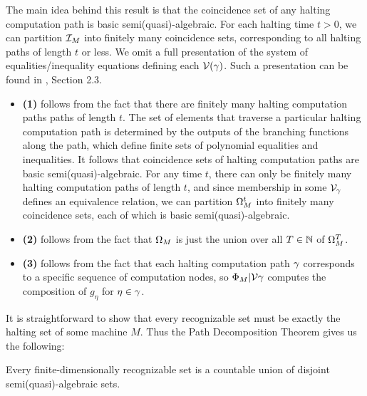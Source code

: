   \begin{proofsketch}
    
    The main idea behind this result is that the coincidence set of
    any halting computation path is basic semi(quasi)-algebraic.  For
    each halting time $t > 0$, we can partition $\mathcal{I}_M$ into
    finitely many coincidence sets, corresponding to all halting paths
    of length $t$ or less.  We omit a full presentation of the system
    of equalities/inequality equations defining each
    $\mathcal{V}(\gamma)$.  Such a presentation can be found in
    \cite{B98}, Section 2.3.

    \begin{itemize}
    \item \textbf{(1)} follows from the fact that there are finitely
      many halting computation paths paths of length $t$.  The set of
      elements that traverse a particular halting computation path is
      determined by the outputs of the branching functions along the
      path, which define finite sets of polynomial equalities and
      inequalities.  It follows that coincidence sets of halting
      computation paths are basic semi(quasi)-algebraic. For any time
      $t$, there can only be finitely many halting computation paths
      of length $t$, and since membership in some
      $\mathcal{V}_\gamma$ defines an equivalence relation, we
      can partition $\Omega_M^t$ into finitely many coincidence
      sets, each of which is basic semi(quasi)-algebraic.
    \item \textbf{(2)} follows from the fact that $\Omega_M$ is just
      the union over all $T \in \mathbb{N}$ of $\Omega_M^T$.
    \item \textbf{(3)} follows from the fact that each halting
      computation path $\gamma$ corresponds to a specific
      sequence of computation nodes, so
      $\Phi_M|\mathcal{V}{\gamma}$ computes the
      composition of $g_{\eta}$ for $\eta \in \gamma$.
    \end{itemize}
  \end{proofsketch}

  It is straightforward to show that every recognizable set must be
  exactly the halting set of some machine $M$.  Thus the Path
  Decomposition Theorem gives us the following:

  \begin{corollary}
    Every finite-dimensionally recognizable set is a countable union
    of disjoint semi(quasi)-algebraic sets.
  \end{corollary}

